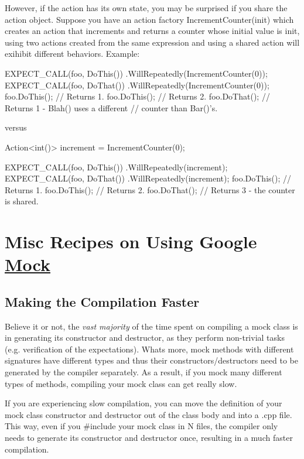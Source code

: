 However, if the action has its own state, you may be surprised if you share the action object. Suppose you have an action factory {\ttfamily Increment\+Counter(init)} which creates an action that increments and returns a counter whose initial value is {\ttfamily init}, using two actions created from the same expression and using a shared action will exihibit different behaviors. Example\+:


\begin{DoxyCode}
EXPECT\_CALL(foo, DoThis())
    .WillRepeatedly(IncrementCounter(0));
EXPECT\_CALL(foo, DoThat())
    .WillRepeatedly(IncrementCounter(0));
foo.DoThis();  // Returns 1.
foo.DoThis();  // Returns 2.
foo.DoThat();  // Returns 1 - Blah() uses a different
               // counter than Bar()'s.
\end{DoxyCode}


versus


\begin{DoxyCode}
Action<int()> increment = IncrementCounter(0);

EXPECT\_CALL(foo, DoThis())
    .WillRepeatedly(increment);
EXPECT\_CALL(foo, DoThat())
    .WillRepeatedly(increment);
foo.DoThis();  // Returns 1.
foo.DoThis();  // Returns 2.
foo.DoThat();  // Returns 3 - the counter is shared.
\end{DoxyCode}


\section*{Misc Recipes on Using Google \hyperlink{class_mock}{Mock}}

\subsection*{Making the Compilation Faster}

Believe it or not, the {\itshape vast majority} of the time spent on compiling a mock class is in generating its constructor and destructor, as they perform non-\/trivial tasks (e.\+g. verification of the expectations). What\textquotesingle{}s more, mock methods with different signatures have different types and thus their constructors/destructors need to be generated by the compiler separately. As a result, if you mock many different types of methods, compiling your mock class can get really slow.

If you are experiencing slow compilation, you can move the definition of your mock class\textquotesingle{} constructor and destructor out of the class body and into a {\ttfamily .cpp} file. This way, even if you {\ttfamily \#include} your mock class in N files, the compiler only needs to generate its constructor and destructor once, resulting in a much faster compilation.

